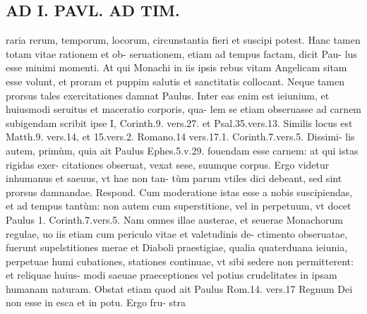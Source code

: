 \documentclass{article}
\begin{document}
\begin{pages}
\section*{AD I. PAVL. AD TIM. }
\marginpar{[ p.210 ]}\pstart raria rerum, temporum, locorum, circunstantia fieri et suscipi potest.  \pend\pstart Hanc tamen totam vitae rationem et ob- seruationem, etiam ad tempus factam, dicit Pau- lus esse minimi momenti. At qui Monachi in iis ipsis rebus vitam Angelicam sitam esse volunt, et proram et puppim salutis et sanctitatis collocant.  \pend\pstart Neque tamen prorsus tales exercitationes damnat Paulus. Inter eas enim est ieiunium, et huiusmodi seruitus et maceratio corporis, qua- lem se etiam obseruasse ad carnem subigendam scribit ipse I, Corinth.9. vers.27. et Psal.35.vers.13. Similis locus est Matth.9. vers.14, et 15.vers.2. Romano.14 vers.17.1. Corinth.7.vers.5. Dissimi- lis autem, primùm, quia ait Paulus Ephes.5.v.29. fouendam esse carnem: at qui istas rigidas exer- citationes obseruat, vexat sese, suumque corpus. Ergo videtur inhumanus et saeuus, vt hae non tan- tùm parum vtiles dici debeant, sed sint prorsus damnandae. Respond. Cum moderatione istas esse a nobis suscipiendas, et ad tempus tantùm: non autem cum superstitione, vel in perpetuum, vt docet Paulus 1. Corinth.7.vers.5. Nam omnes illae austerae, et seuerae Monachorum regulae, uo iis etiam cum periculo vitae et valetudinis de- ctimento obseruatae, fuerunt supelstitiones merae et Diaboli praestigiae, qualia quaterduana ieiunia, perpetuae humi cubationes, stationes continuae, vt sibi sedere non permitterent: et reliquae huius- modi saeuae praeceptiones vel potius crudelitates in ipsam humanam naturam. Obstat etiam quod ait Paulus Rom.14. vers.17  \pend\pstart Regnum Dei non esse in esca et in potu. Ergo fru- stra  \pend

\end{pages}
\end{document}
